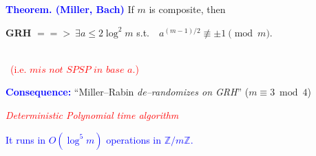 \documentclass[landscape,display]{powersem} %
\newcommand{\heading}[1]{%
 \begin{center}
  \large\bf
  \shadowbox{{\textcolor{conceptcolor}{#1}}}%
 \end{center}
 \vspace{1ex minus 1ex}}
\begin{document}
\begin{slide}
\heading{Deterministic primality tests}\pause

\textbf{\textcolor{blue}{Theorem. (Miller, Bach)}} If $m$ is
composite, then \centerline{\textbf{{GRH}} $=\!\!\!=\!\!\!>\
\exists a\leq 2\log^2 m$ s.t.\ \ $a^{(m-1)/2}\not\equiv
\pm1\pmod{m}$.}\\ \ \hfill\textcolor{red}{(i.e. $m \textit{
is not SPSP in base } a.$)}\pause

\small{\textbf{\textcolor{blue}{Consequence:}} ``Miller--Rabin
\emph{de--randomizes on GRH}'' ($m\equiv3\bmod4$)}\pause

\pause

\emph{\textcolor{red}{Deterministic Polynomial time algorithm}}\pause

\textcolor{blue}{It runs in $O(\log^5m)$ operations in ${\mathbb
Z}/m\mathbb Z$.}


\end{slide}
\end{document}
